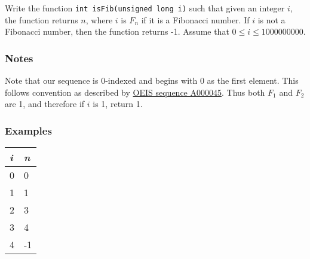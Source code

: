 \documentclass{article}
\begin{document}
Write the function \texttt{int isFib(unsigned long i)} such that given an integer $i$, the function returns $n$, where $i$ is $F_n$ if it is a Fibonacci number. 
If $i$ is not a Fibonacci number, then the function returns -1.
Assume that $ 0 \le i \le 1000000000$.

\subsubsection{Notes}
Note that our sequence is 0-indexed and begins with 0 as the first element. 
This follows convention as described by \href{https://oeis.org/A000045}{OEIS sequence A000045}.
Thus both $F_1$ and $F_2$ are 1, and therefore if $i$ is 1, return 1.

\subsubsection{Examples}

\begin{center}
  \label{fibexamples}
  \begin{tabular}{|l|l|}
    \hline
    {\it i} & {\it n} \\
    \hline
    0 & 0 \\
    1 & 1 \\
    2 & 3 \\
    3 & 4 \\
    4 & -1 \\
    \hline
  \end{tabular}
\end{center}
\end{document}
